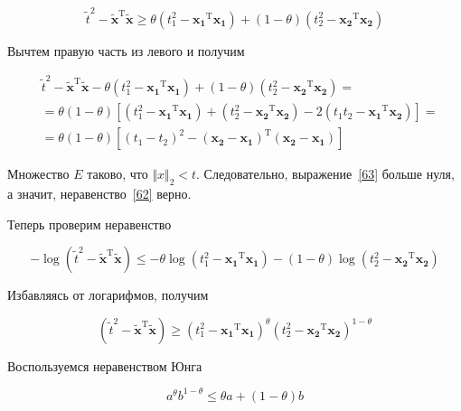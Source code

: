 	\begin{equation}
	\label{62}
	\tilde{t}^2 - \mathbf{\tilde{x}}^\text{T} \mathbf{\tilde{x}} \geqslant \theta
	(t_1^2 - \mathbf{x_1}^\text{T} \mathbf{x_1}) + (1-\theta)(t_2^2 -
	\mathbf{x_2}^\text{T} \mathbf{x_2})
	\end{equation}
	
	Вычтем правую часть из левого и получим
	
	
	
	\begin{equation}
	\begin{split}
	\label{63}
	&\tilde{t}^2 - \mathbf{\tilde{x}}^\text{T} \mathbf{\tilde{x}} - \theta (t_1^2 -
	\mathbf{x_1}^\text{T} \mathbf{x_1}) + (1-\theta)(t_2^2 - \mathbf{x_2}^\text{T}
	\mathbf{x_2}) = \\
	&= \theta(1-\theta) \left[ (t_1^2 - \mathbf{x_1}^\text{T} \mathbf{x_1}) +
	(t_2^2 - \mathbf{x_2}^\text{T} \mathbf{x_2}) - 2(t_1 t_2 - \mathbf{x_1}^\text{T}
	\mathbf{x_2})\right] = \\
	&=\theta(1-\theta) \left[ (t_1-t_2)^2 - (\mathbf{x_2} -
	\mathbf{x_1})^\text{T}(\mathbf{x_2} - \mathbf{x_1})\right] 
	\end{split}
	\end{equation}
	
	Множество $E$ таково, что $\Vert x \Vert_2 < t$. Следовательно,
	выражение~\eqref{63} больше нуля, а значит, неравенство~\eqref{62} верно.
	
	Теперь проверим неравенство
	
	\begin{equation}
	\label{64}
	-\log(\tilde{t}^2 - \mathbf{\tilde{x}}^\text{T} \mathbf{\tilde{x}}) \leqslant -
	\theta \log(t_1^2 - \mathbf{x_1}^\text{T} \mathbf{x_1}) - (1-\theta) \log(t_2^2
	- \mathbf{x_2}^\text{T} \mathbf{x_2})
	\end{equation}
	
	Избавляясь от логарифмов, получим
	
	\begin{equation}
	\label{65}
	(\tilde{t}^2 - \mathbf{\tilde{x}}^\text{T} \mathbf{\tilde{x}}) \geqslant (t_1^2
	- \mathbf{x_1}^\text{T} \mathbf{x_1})^{\theta} (t_2^2 - \mathbf{x_2}^\text{T}
	\mathbf{x_2})^{1-\theta}
	\end{equation}
	
	Воспользуемся неравенством Юнга
	
	\begin{equation}
	a^\theta b^{1-\theta} \leqslant \theta a + (1-\theta) b
	\end{equation}
	
